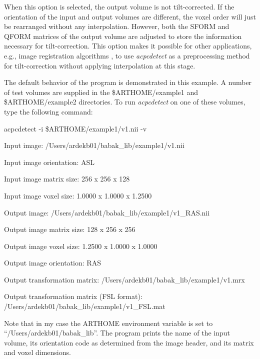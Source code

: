 \documentclass[11pt]{article}
\begin{document}

When this option is selected, the output volume is not tilt-corrected.  If the
orientation of the input and output volumes are different, the voxel 
order will just be rearranged without any interpolation.  However, 
both the SFORM and QFORM matrices of the output volume are adjusted to store
the information necessary for tilt-correction.  This option makes it
possible for other applications, e.g., image registration algorithms \citep{pmid35288224},
to use {\it acpcdetect} as a preprocessing method for tilt-correction
without applying interpolation at this stage. 
\vspace{3mm}

 The default behavior of the program is demonstrated in this example.
A number of test volumes are supplied in the \$ARTHOME/example1 and \$ARTHOME/example2 directories. To run
{\it acpcdetect} on one of these volumes, type the following command:

acpcdetect -i \$ARTHOME/example1/v1.nii -v


Input image: /Users/ardekb01/babak\_lib/example1/v1.nii

Input image orientation: ASL

Input image matrix size: 256 x 256 x 128

Input image voxel size: 1.0000 x 1.0000 x 1.2500

Output image: /Users/ardekb01/babak\_lib/example1/v1\_RAS.nii

Output image matrix size: 128 x 256 x 256

Output image voxel size: 1.2500 x 1.0000 x 1.0000

Output image orientation: RAS

Output transformation matrix: /Users/ardekb01/babak\_lib/example1/v1.mrx

Output transformation matrix (FSL format): /Users/ardekb01/babak\_lib/example1/v1\_FSL.mat 

\noindent
Note that in my case the ARTHOME environment variable is set to 
``/Users/ardekb01/babak\_lib''. 
The program prints the name of the input volume, its orientation code as determined from the image header,
and its matrix and voxel dimensions.  
\end{document}
